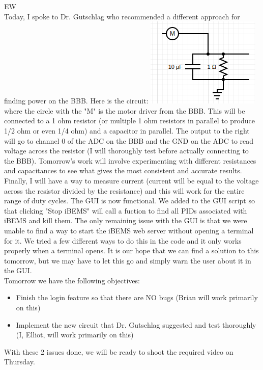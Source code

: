 \documentclass[fontsize=11pt, %
                             paper=letter, %
                             openany, %
                             captions=tableheading,
                             index=totoc,
                             hyperref]{labbook}
\begin{document}
EW\\
Today, I spoke to Dr. Gutschlag who recommended a different approach for finding power on the BBB. Here is the circuit:
\medbreak\noindent
\includegraphics[scale=1]{figs/beaglebone/power_BBB.png}
\\
where the circle with the "M" is the motor driver from the BBB. This will be connected to a 1 ohm resistor (or multiple 1 ohm resistors in parallel to produce 1/2 ohm or even 1/4 ohm) and a capacitor in parallel. The output to the right will go to channel 0 of the ADC on the BBB and the GND on the ADC to read voltage across the resistor (I will thoroughly test before actually connecting to the BBB). Tomorrow's work will involve experimenting with different resistances and capacitances to see what gives the most consistent and accurate results. Finally, I will have a way to measure current (current will be equal to the voltage across the resistor divided by the resistance) and this will work for the entire range of duty cycles.
\medbreak\noindent
The GUI is now functional. We added to the GUI script so that clicking "Stop iBEMS" will call a fuction to find all PIDs associated with iBEMS and kill them. The only remaining issue with the GUI is that we were unable to find a way to start the iBEMS web server without opening a terminal for it. We tried a few different ways to do this in the code and it only works properly when a terminal opens. It is our hope that we can find a solution to this tomorrow, but we may have to let this go and simply warn the user about it in the GUI.
\medbreak\noindent
\\
Tomorrow we have the following objectives:
\begin{itemize}
	\item Finish the login feature so that there are NO bugs 		(Brian will work primarily on this)
	\item Implement the new circuit that Dr. Gutschlag 				suggested and test thoroughly (I, Elliot, will work 			primarily on this)
\end{itemize}
With these 2 issues done, we will be ready to shoot the required video on Thursday.
\end{document}
